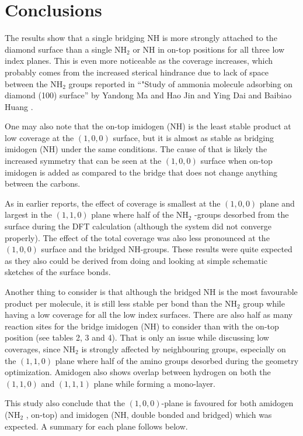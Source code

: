 \documentclass[10pt,a4paper]{article}
\begin{document}
\section{Conclusions}
The results show that a single bridging NH is more strongly attached to the diamond surface than a single NH$_2$ or NH in on-top positions for all three low index planes. This is even more noticeable as the coverage increases, which probably comes from the increased sterical hindrance due to lack of space between the NH$_2$ groups reported in ``"Study of ammonia molecule adsorbing on diamond (100) surface'' by Yandong Ma and Hao Jin and Ying Dai and Baibiao Huang \cite{yan.dong2010}.

 One may also note that the on-top imidogen (NH) is the least stable product at low coverage at the $(1,  0,  0)$ surface, but it is almost as stable as bridging imidogen (NH) under the same conditions. The cause of that is likely the increased symmetry that can be seen at the $(1,  0,  0)$ surface when on-top imidogen is added as compared to the bridge that does not change anything between the carbons. 

 As in earlier reports, the effect of coverage is smallest at the $(1,  0,  0)$ plane and largest in the $(1,  1,  0)$ plane where half of the NH$_2$ -groups desorbed from the surface during the DFT calculation (although the system did not converge properly). The effect of the total coverage was also less pronounced at the $(1,  0,  0)$ surface and the bridged NH-groups. These results were quite expected as they also could be derived from doing and looking at  simple schematic sketches of the surface bonds.
 
 
 Another thing to consider is that although the bridged NH is the most favourable product per molecule, it is still less stable per bond than the NH$_2$ group while having a low coverage for all the low index surfaces. There are also half as many reaction sites for the bridge imidogen (NH) to consider than with the on-top position (see tables 2, 3 and 4). That is only an issue while discussing low coverages, since NH$_2$ is strongly affected by neighbouring groups, especially on the $(1,  1,  0)$ plane where half of the amino groups desorbed during the geometry optimization. Amidogen also shows overlap between hydrogen on both the $(1,  1,  0)$ and $(1,  1, 1)$ plane while forming a mono-layer. 
 
 This study also conclude that the $(1,  0,  0)$-plane is favoured for both amidogen (NH$_2$ , on-top) and imidogen (NH, double bonded and bridged) which was expected. A summary for each plane follows below.
\end{document}
